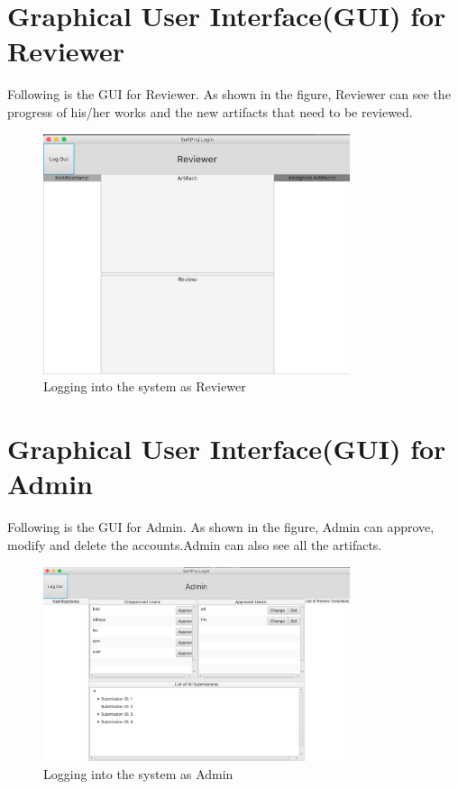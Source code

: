 \section{Graphical User Interface(GUI) for Reviewer}
 Following is the GUI for Reviewer. As shown in the figure, Reviewer can see the progress of his/her works and the new artifacts that need to be reviewed.


\begin{figure}[h]
\includegraphics[width=9cm]{content/9.png}
\centering
\caption{Logging into the system as Reviewer}
\end{figure}





\section{Graphical User Interface(GUI) for Admin}
 Following is the GUI for Admin. As shown in the figure, Admin can approve, modify and delete the accounts.Admin can also see all the artifacts.


\begin{figure}[h]
\includegraphics[width=9cm]{content/7.png}
\centering
\caption{Logging into the system as Admin}
\end{figure}









